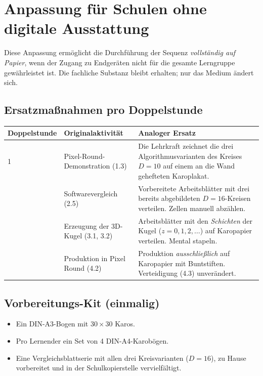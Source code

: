 \documentclass[12pt,a4paper]{scrartcl}
\begin{document}
\section{Anpassung für Schulen ohne digitale Ausstattung}\label{ap:adapt}

Diese Anpassung ermöglicht die Durchführung der Sequenz \emph{vollständig auf Papier}, wenn der Zugang zu Endgeräten nicht für die gesamte Lerngruppe gewährleistet ist. Die fachliche Substanz bleibt erhalten; nur das Medium ändert sich.

\subsection{Ersatzmaßnahmen pro Doppelstunde}

\begin{center}
\small
\begin{tabularx}{\textwidth}{@{}p{}p{}X@{}}
\toprule
\textbf{Doppelstunde} & \textbf{Originalaktivität} & \textbf{Analoger Ersatz} \\
\midrule
1 & Pixel-Round-Demonstration (1.3) & Die Lehrkraft zeichnet die drei Algorithmusvarianten des Kreises $D = 10$ auf einem an die Wand gehefteten Karoplakat. \\
\addlinespace[3pt]
2 & Softwarevergleich (2.5) & Vorbereitete Arbeitsblätter mit drei bereits abgebildeten $D = 16$-Kreisen verteilen. Zellen manuell abzählen. \\
\addlinespace[3pt]
3 & Erzeugung der 3D-Kugel (3.1, 3.2) & Arbeitsblätter mit den \emph{Schichten} der Kugel ($z = 0, 1, 2, \ldots$) auf Karopapier verteilen. Mental stapeln. \\
\addlinespace[3pt]
4 & Produktion in Pixel Round (4.2) & Produktion \emph{ausschließlich} auf Karopapier mit Buntstiften. Verteidigung (4.3) unverändert. \\
\bottomrule
\end{tabularx}
\end{center}

\subsection{Vorbereitungs-Kit (einmalig)}
\begin{itemize}[leftmargin=1.3em,itemsep=0.1em,topsep=0.2em,nosep]
  \item Ein DIN-A3-Bogen mit $30 \times 30$ Karos.
  \item Pro Lernender ein Set von 4 DIN-A4-Karobögen.
  \item Eine Vergleichsblattserie mit allen drei Kreisvarianten ($D = 16$), zu Hause vorbereitet und in der Schulkopierstelle vervielfältigt.
\end{itemize}
\end{document}
